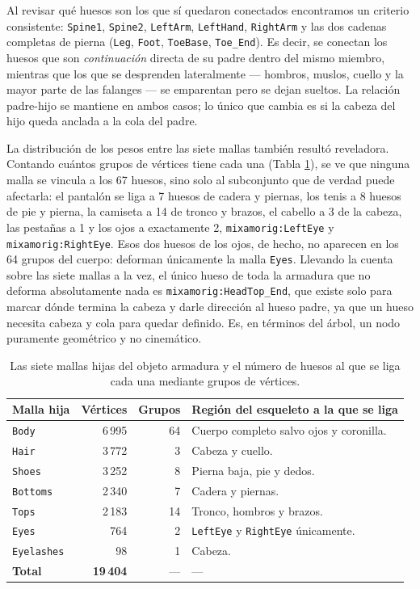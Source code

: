 Al revisar qué huesos son los que sí quedaron conectados encontramos un criterio consistente: \texttt{Spine1}, \texttt{Spine2}, \texttt{LeftArm}, \texttt{LeftHand}, \texttt{RightArm} y las dos cadenas completas de pierna (\texttt{Leg}, \texttt{Foot}, \texttt{ToeBase}, \texttt{Toe\_End}). Es decir, se conectan los huesos que son \textit{continuación} directa de su padre dentro del mismo miembro, mientras que los que se desprenden lateralmente --- hombros, muslos, cuello y la mayor parte de las falanges --- se emparentan pero se dejan sueltos. La relación padre-hijo se mantiene en ambos casos; lo único que cambia es si la cabeza del hijo queda anclada a la cola del padre.

La distribución de los pesos entre las siete mallas también resultó reveladora. Contando cuántos grupos de vértices tiene cada una (Tabla \ref{tab:mallas_remy}), se ve que ninguna malla se vincula a los 67 huesos, sino solo al subconjunto que de verdad puede afectarla: el pantalón se liga a 7 huesos de cadera y piernas, los tenis a 8 huesos de pie y pierna, la camiseta a 14 de tronco y brazos, el cabello a 3 de la cabeza, las pestañas a 1 y los ojos a exactamente 2, \texttt{mixamorig:LeftEye} y \texttt{mixamorig:RightEye}. Esos dos huesos de los ojos, de hecho, no aparecen en los 64 grupos del cuerpo: deforman únicamente la malla \texttt{Eyes}. Llevando la cuenta sobre las siete mallas a la vez, el único hueso de toda la armadura que no deforma absolutamente nada es \texttt{mixamorig:HeadTop\_End}, que existe solo para marcar dónde termina la cabeza y darle dirección al hueso padre, ya que un hueso necesita cabeza y cola para quedar definido. Es, en términos del árbol, un nodo puramente geométrico y no cinemático.

\begin{table}[H]
\centering
\begin{tabular}{@{}lrrp{7.2cm}@{}}
\toprule
\textbf{Malla hija} & \textbf{Vértices} & \textbf{Grupos} & \textbf{Región del esqueleto a la que se liga} \\
\midrule
\texttt{Body}      & 6\,995 & 64 & Cuerpo completo salvo ojos y coronilla. \\
\texttt{Hair}      & 3\,772 &  3 & Cabeza y cuello. \\
\texttt{Shoes}     & 3\,252 &  8 & Pierna baja, pie y dedos. \\
\texttt{Bottoms}   & 2\,340 &  7 & Cadera y piernas. \\
\texttt{Tops}      & 2\,183 & 14 & Tronco, hombros y brazos. \\
\texttt{Eyes}      &    764 &  2 & \texttt{LeftEye} y \texttt{RightEye} únicamente. \\
\texttt{Eyelashes} &     98 &  1 & Cabeza. \\
\midrule
\textbf{Total}     & \textbf{19\,404} & --- & --- \\
\bottomrule
\end{tabular}
\caption{Las siete mallas hijas del objeto armadura y el número de huesos al que se liga cada una mediante grupos de vértices.}
\label{tab:mallas_remy}
\end{table}

